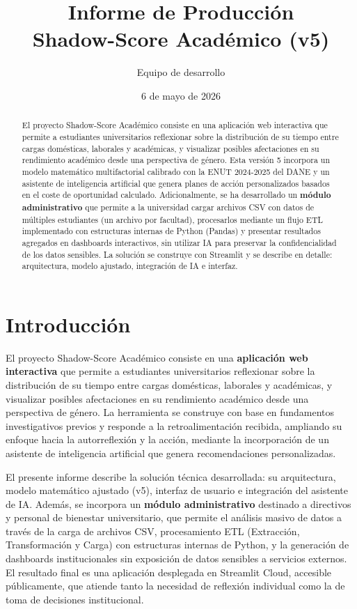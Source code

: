 \documentclass[12pt, spanish]{article}
\title{Informe de Producción\\Shadow-Score Académico (v5)}
\author{Equipo de desarrollo}
\date{6 de mayo de 2026}
\begin{document}
\maketitle

\begin{abstract}
El proyecto Shadow-Score Académico consiste en una aplicación web interactiva que permite a estudiantes universitarios reflexionar sobre la distribución de su tiempo entre cargas domésticas, laborales y académicas, y visualizar posibles afectaciones en su rendimiento académico desde una perspectiva de género. Esta versión 5 incorpora un modelo matemático multifactorial calibrado con la ENUT 2024-2025 del DANE y un asistente de inteligencia artificial que genera planes de acción personalizados basados en el coste de oportunidad calculado. Adicionalmente, se ha desarrollado un \textbf{módulo administrativo} que permite a la universidad cargar archivos CSV con datos de múltiples estudiantes (un archivo por facultad), procesarlos mediante un flujo ETL implementado con estructuras internas de Python (Pandas) y presentar resultados agregados en dashboards interactivos, sin utilizar IA para preservar la confidencialidad de los datos sensibles. La solución se construye con Streamlit y se describe en detalle: arquitectura, modelo ajustado, integración de IA e interfaz.
\end{abstract}

\section{Introducción}

El proyecto Shadow-Score Académico consiste en una \textbf{aplicación web interactiva} que permite a estudiantes universitarios reflexionar sobre la distribución de su tiempo entre cargas domésticas, laborales y académicas, y visualizar posibles afectaciones en su rendimiento académico desde una perspectiva de género. La herramienta se construye con base en fundamentos investigativos previos y responde a la retroalimentación recibida, ampliando su enfoque hacia la autorreflexión y la acción, mediante la incorporación de un asistente de inteligencia artificial que genera recomendaciones personalizadas.

El presente informe describe la solución técnica desarrollada: su arquitectura, modelo matemático ajustado (v5), interfaz de usuario e integración del asistente de IA. Además, se incorpora un \textbf{módulo administrativo} destinado a directivos y personal de bienestar universitario, que permite el análisis masivo de datos a través de la carga de archivos CSV, procesamiento ETL (Extracción, Transformación y Carga) con estructuras internas de Python, y la generación de dashboards institucionales sin exposición de datos sensibles a servicios externos. El resultado final es una aplicación desplegada en Streamlit Cloud, accesible públicamente, que atiende tanto la necesidad de reflexión individual como la de toma de decisiones institucional.
\end{document}
